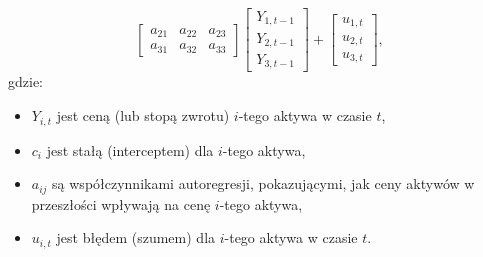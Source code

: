\begin{enumerate}
\begin{equation}
\begin{bmatrix}
a_{21} & a_{22} & a_{23} \\
a_{31} & a_{32} & a_{33}
\end{bmatrix}
\begin{bmatrix}
Y_{1,t-1} \\
Y_{2,t-1} \\
Y_{3,t-1}
\end{bmatrix}
+
\begin{bmatrix}
u_{1,t} \\
u_{2,t} \\
u_{3,t}
\end{bmatrix},
\end{equation}
gdzie:
\begin{itemize}
  \item \( Y_{i,t} \) jest ceną (lub stopą zwrotu) \( i \)-tego aktywa w czasie \( t \),
  \item \( c_i \) jest stałą (interceptem) dla \( i \)-tego aktywa,
  \item \( a_{ij} \) są współczynnikami autoregresji, pokazującymi, jak ceny aktywów w przeszłości wpływają na cenę \( i \)-tego aktywa,
  \item \( u_{i,t} \) jest błędem (szumem) dla \( i \)-tego aktywa w czasie \( t \).
\end{itemize}


\end{enumerate}
